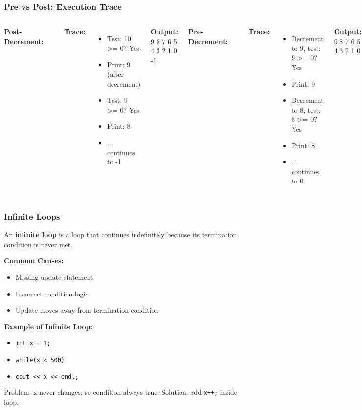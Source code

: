 \documentclass{beamer}
\begin{document}
\begin{frame}[fragile]
\frametitle{Pre vs Post: Execution Trace}
\begin{columns}[t]
\textbf{Post-Decrement:}
\begin{verbatim}
int countDown = 10;
while(countDown-- >= 0) {
    cout << countDown << '\n';
}
\end{verbatim}
\textbf{Trace:}
\begin{itemize}
\item Test: 10 >= 0? Yes
\item Print: 9 (after decrement)
\item Test: 9 >= 0? Yes
\item Print: 8
\item ... continues to -1
\end{itemize}
\textbf{Output:} 9 8 7 6 5 4 3 2 1 0 -1

\textbf{Pre-Decrement:}
\begin{verbatim}
int countDown = 10;
while(--countDown >= 0) {
    cout << countDown << '\n';
}
\end{verbatim}
\textbf{Trace:}
\begin{itemize}
\item Decrement to 9, test: 9 >= 0? Yes
\item Print: 9
\item Decrement to 8, test: 8 >= 0? Yes
\item Print: 8
\item ... continues to 0
\end{itemize}
\textbf{Output:} 9 8 7 6 5 4 3 2 1 0
\end{columns}
\end{frame}

\begin{frame}
\frametitle{Infinite Loops}
An \textbf{infinite loop} is a loop that continues indefinitely because its termination condition is never met.

\textbf{Common Causes:}
\begin{itemize}
\item Missing update statement
\pause
\item Incorrect condition logic
\pause
\item Update moves away from termination condition
\end{itemize}

\textbf{Example of Infinite Loop:}
\begin{itemize}
\item \texttt{int x = 1;}
\item \texttt{while(x < 500)}
\item \texttt{cout << x << endl;}
\end{itemize}

Problem: x never changes, so condition always true. Solution: add \texttt{x++;} inside loop.
\end{frame}
\end{document}
